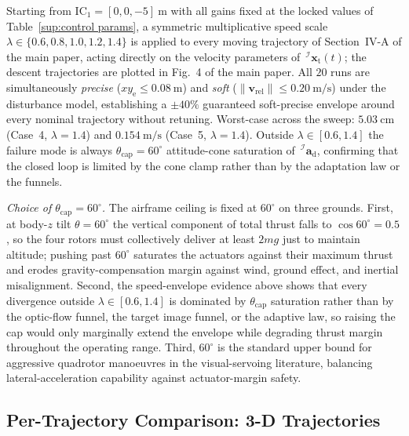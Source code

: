 \documentclass[10pt,journal]{IEEEtran}
\begin{document}
Starting from IC$_1=[0,0,-5]~\text{m}$ with all gains fixed at the locked values of Table~\ref{sup:control params}, a symmetric multiplicative speed scale $\lambda\in\{0.6,0.8,1.0,1.2,1.4\}$ is applied to every moving trajectory of Section~IV-A of the main paper, acting directly on the velocity parameters of $\,^\mathcal{I}\boldsymbol{x}_\text{t}(t)$; the descent trajectories are plotted in Fig.~4 of the main paper. All $20$ runs are simultaneously \emph{precise} ($xy_\text{e}\le 0.08~\text{m}$) and \emph{soft} ($\|\boldsymbol{v}_\text{rel}\|\le 0.20~\text{m/s}$) under the disturbance model, establishing a $\pm 40\%$ guaranteed soft-precise envelope around every nominal trajectory without retuning. Worst-case across the sweep: $5.03~\text{cm}$ (Case~4, $\lambda=1.4$) and $0.154~\text{m/s}$ (Case~5, $\lambda=1.4$). Outside $\lambda\in[0.6,1.4]$ the failure mode is always $\theta_\text{cap}=60^\circ$ attitude-cone saturation of $\,^\mathcal{I}\boldsymbol{a}_\text{d}$, confirming that the closed loop is limited by the cone clamp rather than by the adaptation law or the funnels.

\textit{Choice of $\theta_\text{cap}=60^\circ$.} The airframe ceiling is fixed at $60^\circ$ on three grounds. First, at body-$z$ tilt $\theta=60^\circ$ the vertical component of total thrust falls to $\cos 60^\circ = 0.5$, so the four rotors must collectively deliver at least $2mg$ just to maintain altitude; pushing past $60^\circ$ saturates the actuators against their maximum thrust and erodes gravity-compensation margin against wind, ground effect, and inertial misalignment. Second, the speed-envelope evidence above shows that every divergence outside $\lambda\in[0.6,1.4]$ is dominated by $\theta_\text{cap}$ saturation rather than by the optic-flow funnel, the target image funnel, or the adaptive law, so raising the cap would only marginally extend the envelope while degrading thrust margin throughout the operating range. Third, $60^\circ$ is the standard upper bound for aggressive quadrotor manoeuvres in the visual-servoing literature, balancing lateral-acceleration capability against actuator-margin safety.

\clearpage
\subsection{Per-Trajectory Comparison: 3-D Trajectories}
\label{sec:sup-comparison-3d}
\end{document}
